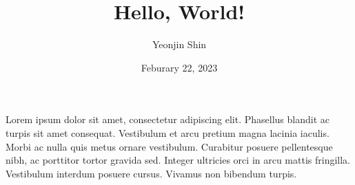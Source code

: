 \documentclass{article}
\title{Hello, World!}
\author{Yeonjin Shin}
\date{Feburary 22, 2023}
\begin{document}
\maketitle
Lorem ipsum dolor sit amet, consectetur adipiscing elit. Phasellus blandit ac turpis sit amet consequat. Vestibulum et arcu pretium magna lacinia iaculis. Morbi ac nulla quis metus ornare vestibulum. Curabitur posuere pellentesque nibh, ac porttitor tortor gravida sed. Integer ultricies orci in arcu mattis fringilla. Vestibulum interdum posuere cursus. Vivamus non bibendum turpis. 
\end{document}
